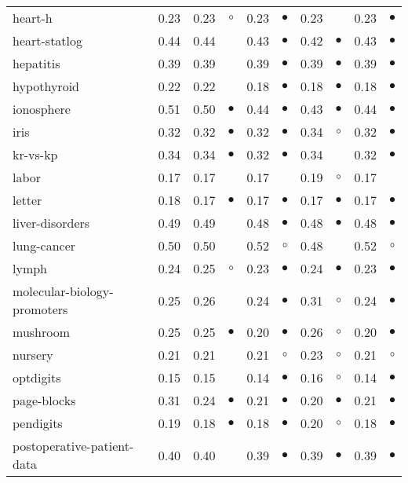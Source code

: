 {\begin{longtable}{lrr@{\hspace{0.1cm}}cr@{\hspace{0.1cm}}cr@{\hspace{0.1cm}}cr@{\hspace{0.1cm}}c}
heart-h & 0.23 & 0.23 &   $\circ$ & 0.23 & $\bullet$ & 0.23 &            & 0.23 & $\bullet$\\
heart-statlog & 0.44 & 0.44 &           & 0.43 & $\bullet$ & 0.42 &  $\bullet$ & 0.43 & $\bullet$\\
hepatitis & 0.39 & 0.39 &           & 0.39 & $\bullet$ & 0.39 &  $\bullet$ & 0.39 & $\bullet$\\
hypothyroid & 0.22 & 0.22 &           & 0.18 & $\bullet$ & 0.18 &  $\bullet$ & 0.18 & $\bullet$\\
ionosphere & 0.51 & 0.50 & $\bullet$ & 0.44 & $\bullet$ & 0.43 &  $\bullet$ & 0.44 & $\bullet$\\
iris & 0.32 & 0.32 & $\bullet$ & 0.32 & $\bullet$ & 0.34 &    $\circ$ & 0.32 & $\bullet$\\
kr-vs-kp & 0.34 & 0.34 & $\bullet$ & 0.32 & $\bullet$ & 0.34 &            & 0.32 & $\bullet$\\
labor & 0.17 & 0.17 &           & 0.17 &           & 0.19 &    $\circ$ & 0.17 &          \\
letter & 0.18 & 0.17 & $\bullet$ & 0.17 & $\bullet$ & 0.17 &  $\bullet$ & 0.17 & $\bullet$\\
liver-disorders & 0.49 & 0.49 &           & 0.48 & $\bullet$ & 0.48 &  $\bullet$ & 0.48 & $\bullet$\\
lung-cancer & 0.50 & 0.50 &           & 0.52 &   $\circ$ & 0.48 &            & 0.52 &   $\circ$\\
lymph & 0.24 & 0.25 &   $\circ$ & 0.23 & $\bullet$ & 0.24 &  $\bullet$ & 0.23 & $\bullet$\\
molecular-biology-promoters & 0.25 & 0.26 &           & 0.24 & $\bullet$ & 0.31 &    $\circ$ & 0.24 & $\bullet$\\
mushroom & 0.25 & 0.25 & $\bullet$ & 0.20 & $\bullet$ & 0.26 &    $\circ$ & 0.20 & $\bullet$\\
nursery & 0.21 & 0.21 &           & 0.21 &   $\circ$ & 0.23 &    $\circ$ & 0.21 &   $\circ$\\
optdigits & 0.15 & 0.15 &           & 0.14 & $\bullet$ & 0.16 &    $\circ$ & 0.14 & $\bullet$\\
page-blocks & 0.31 & 0.24 & $\bullet$ & 0.21 & $\bullet$ & 0.20 &  $\bullet$ & 0.21 & $\bullet$\\
pendigits & 0.19 & 0.18 & $\bullet$ & 0.18 & $\bullet$ & 0.20 &    $\circ$ & 0.18 & $\bullet$\\
postoperative-patient-data & 0.40 & 0.40 &           & 0.39 & $\bullet$ & 0.39 &  $\bullet$ & 0.39 & $\bullet$\\

\end{longtable}}
